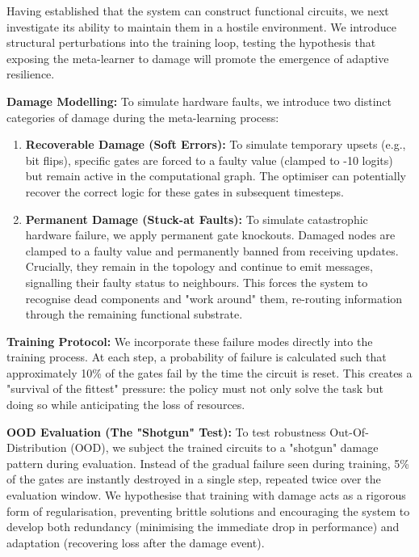 Having established that the system can construct functional circuits, we next investigate its ability to maintain them in a hostile environment. We introduce structural perturbations into the training loop, testing the hypothesis that exposing the meta-learner to damage will promote the emergence of adaptive resilience.

\textbf{Damage Modelling:}
To simulate hardware faults, we introduce two distinct categories of damage during the meta-learning process:

\begin{enumerate}
    \item \textbf{Recoverable Damage (Soft Errors):} To simulate temporary upsets (e.g., bit flips), specific gates are forced to a faulty value (clamped to -10 logits) but remain active in the computational graph. The optimiser can potentially recover the correct logic for these gates in subsequent timesteps.
    \item \textbf{Permanent Damage (Stuck-at Faults):} To simulate catastrophic hardware failure, we apply permanent gate knockouts. Damaged nodes are clamped to a faulty value and permanently banned from receiving updates. Crucially, they remain in the topology and continue to emit messages, signalling their faulty status to neighbours. This forces the system to recognise dead components and "work around" them, re-routing information through the remaining functional substrate.
\end{enumerate}

\textbf{Training Protocol:}
We incorporate these failure modes directly into the training process. At each step, a probability of failure is calculated such that approximately 10\% of the gates fail by the time the circuit is reset. This creates a "survival of the fittest" pressure: the policy must not only solve the task but doing so while anticipating the loss of resources.

\textbf{OOD Evaluation (The "Shotgun" Test):}
To test robustness Out-Of-Distribution (OOD), we subject the trained circuits to a "shotgun" damage pattern during evaluation. Instead of the gradual failure seen during training, 5\% of the gates are instantly destroyed in a single step, repeated twice over the evaluation window.
We hypothesise that training with damage acts as a rigorous form of regularisation, preventing brittle solutions and encouraging the system to develop both redundancy (minimising the immediate drop in performance) and adaptation (recovering loss after the damage event).

